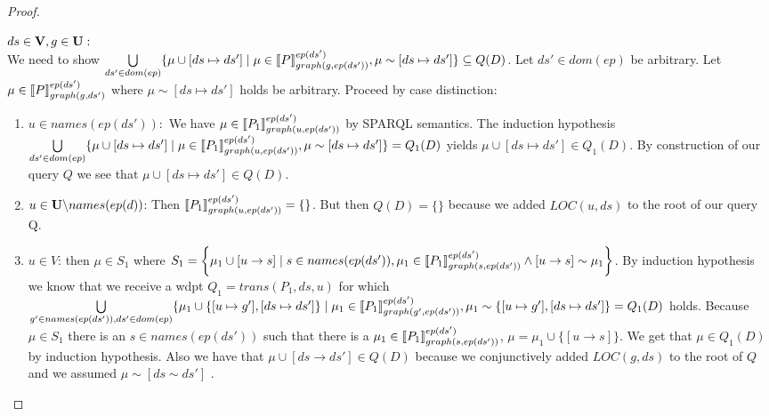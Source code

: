 \begin{proof}
\begin{enumerate}
		\bigskip\noindent
		$ds \in \mathbf{V}, g \in \mathbf{U}:$ \\
		We need to show 
		$\bigcup\limits_{ds' \in dom(ep)} \{ \mu \cup [ds \mapsto ds'] \mid \mu \in
			\llbracket P\rrbracket^{ep(ds')}_{graph(g,ep(ds'))}, \mu \sim
		[ds\mapsto ds'] \}  \subseteq Q(D)$.
		Let $ds' \in dom(ep)$ be arbitrary.
		Let $\mu \in \llbracket P \rrbracket^{ep(ds')}_{graph(g,ds')}$ where 
		$\mu \sim [ds \mapsto ds']$ holds be arbitrary.
		Proceed by case distinction:
		\begin{enumerate}
			\item $u \in names(ep(ds')):$ We have $\mu \in \llbracket P_1
				\rrbracket^{ep(ds')}_{graph(u,ep(ds'))}$ by SPARQL semantics. The
				induction hypothesis $\bigcup\limits_{ds' \in dom(ep)} \{ \mu \cup [ds \mapsto ds'] \mid \mu \in
					\llbracket P_1 \rrbracket^{ep(ds')}_{graph(u,ep(ds'))}, \mu \sim
				[ds\mapsto ds'] \}  = Q_1(D)$ yields $\mu\cup [ds\mapsto ds'] \in Q_1(D)$. 
				By construction of our query $Q$ we see that $\mu \cup [ds\mapsto ds'] \in Q(D)$.
			\item $u \in \mathbf{U} \backslash names(ep(d))$:
				Then $\llbracket P_1 \rrbracket^{ep(ds')}_{graph(u,ep(ds'))} = \{\}$. But then
				$Q(D) = \{\}$ because we added $LOC(u,ds)$ to the root of our
				query Q.
			\item $u \in V$:
				then $\mu \in S_1$ where $S_1 =  \bigg\{\mu_1 \cup [ u \rightarrow s ] \mid
					s \in names(ep(ds')),\\ \mu_1 \in \llbracket P_1
					\rrbracket^{ep(ds')}_{graph(s,ep(ds'))} \land [ u \rightarrow s ] \sim
				\mu_1 \bigg\}$. 
				By induction hypothesis we know that we receive a wdpt $Q_1
				= trans(P_1,ds,u)$ for which \\
				$\bigcup\limits_{g'\in names(ep(ds')),ds' \in dom(ep)} \{ \mu_1 \cup
					\{[u\mapsto g'],[ds \mapsto ds']\} \mid\\
					\mu_1 \in \llbracket P_1 \rrbracket^{ep(ds')}_{graph(g',ep(ds'))}, \mu_1 \sim
					\{[u \mapsto g'], [ds \mapsto ds']\} = Q_1(D)$ holds. 
					Because $\mu \in S_1$ there	is an $s \in names(ep(ds'))$ such
					that there is a $\mu_1 \in \llbracket P_1
					\rrbracket^{ep(ds')}_{graph(s,ep(ds'))}$,
					$\mu = \mu_1 \cup \{[u \rightarrow
					s]\}$. We get that $\mu \in Q_1(D)$ by induction hypothesis.
					Also we have that $\mu \cup [ds \rightarrow ds'] \in Q(D)$
					because we conjunctively added $LOC(g,ds)$ to the root of $Q$ and we
					assumed $\mu \sim [ds \sim ds']$ .
			\end{enumerate}


\end{enumerate}
\end{proof}
